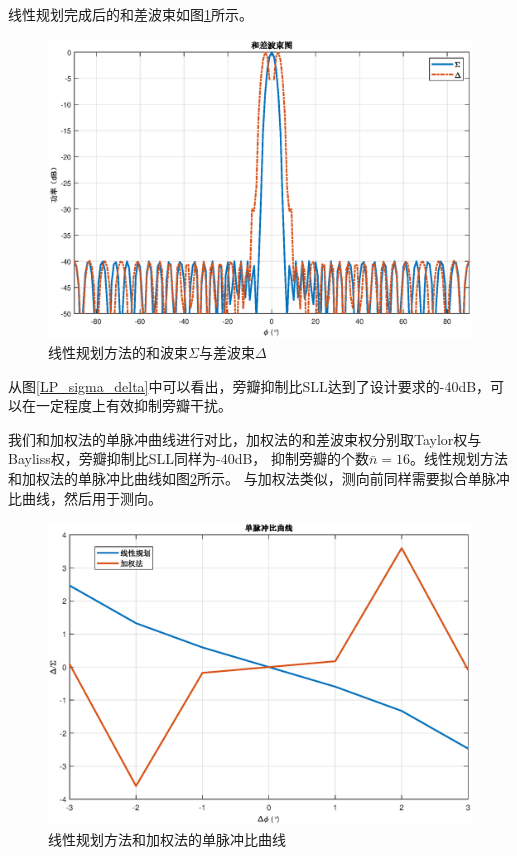 \documentclass[master]{thesis-uestc}
\begin{document}
线性规划完成后的和差波束如图\ref{LP_sigma_delta}所示。
\begin{figure}[H]
    \includegraphics[scale=0.5]{pic/LP_sigma_delta.eps}
    \caption{线性规划方法的和波束$\Sigma$与差波束$\Delta$}
    \label{LP_sigma_delta}
\end{figure}
从图\eqref{LP_sigma_delta}中可以看出，旁瓣抑制比SLL达到了设计要求的-40dB，可以在一定程度上有效抑制旁瓣干扰。

我们和加权法的单脉冲曲线进行对比，加权法的和差波束权分别取Taylor权与Bayliss权，旁瓣抑制比SLL同样为-40dB，
抑制旁瓣的个数$\bar{n}=16$。线性规划方法和加权法的单脉冲比曲线如图\ref{LP_MRC}所示。
与加权法类似，测向前同样需要拟合单脉冲比曲线，然后用于测向。
\begin{figure}[H]
    \includegraphics[scale=0.5]{pic/LP_MRC.eps}
    \caption{线性规划方法和加权法的单脉冲比曲线}
    \label{LP_MRC}
\end{figure}
\end{document}
